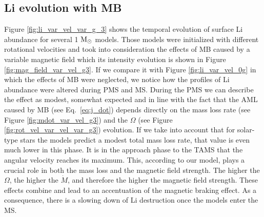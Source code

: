 \documentclass[fleqn,usenatbib]{mnras}
\begin{document}
\subsection{Li evolution with MB}
Figure \ref{fig:li_var_vel_var_g_3} shows the temporal evolution of surface Li abundance for several 1 $\mathrm{M}_\odot$ models. Those models were initialized with different rotational velocities and took into consideration the effects of MB caused by a variable magnetic field which its intensity evolution is shown in Figure \ref{fig:mag_field_var_vel_g3}. If we compare it with Figure \ref{fig:li_var_vel_0g} in which the effects of MB were neglected, we notice how the profiles of Li abundance were altered during PMS and MS. During the PMS we can describe the effect as modest, somewhat expected and in line with the fact that the AML caused by MB (see Eq.~\ref{eq:j_dot}) depends directly on the mass loss rate (see Figure \ref{fig:mdot_var_vel_g3}) and the $\Omega$ (see Figure \ref{fig:rot_vel_var_vel_var_g3}) evolution. If we take into account that for solar-type stars the models predict a modest total mass loss rate, that value is even much lower in this phase. It is in the approach phase to the TAMS that the angular velocity reaches its maximum. This, according to our model, plays a crucial role in both the mass loss and the magnetic field strength. The higher the $\Omega$, the higher the $\Dot{M}$, and therefore the higher the magnetic field strength. These effects combine and lead to an accentuation of the magnetic braking effect. As a consequence, there is a slowing down of Li destruction once the models enter the MS.\par
\end{document}
